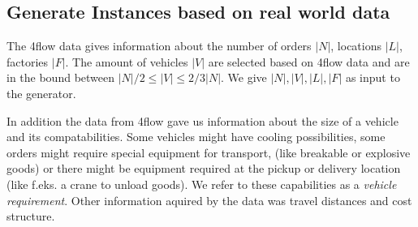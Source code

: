 \documentclass[../main.tex]{subfiles}
\begin{document}
\subsection{Generate Instances based on real world data}
\label{sec:data}
The 4flow data gives information about the number of orders $|N|$, locations $|L|$, factories $|F|$. 
The amount of vehicles $|V|$ are selected based on 4flow data and are in the bound between $|N|/2 \leq |V| \leq 2/3 |N|$.
We give $|N|, |V|, |L|, |F|$ as input to the generator.\par
In addition the data from 4flow gave us information about the size of a vehicle and its compatabilities. 
Some vehicles might have cooling possibilities, some orders might require special equipment for transport, (like breakable or explosive goods) or there might be equipment required at the pickup or delivery location (like f.eks. a crane to unload goods).
We refer to these capabilities as a \emph{vehicle requirement}.
Other information aquired by the data was travel distances and cost structure.
\end{document}
